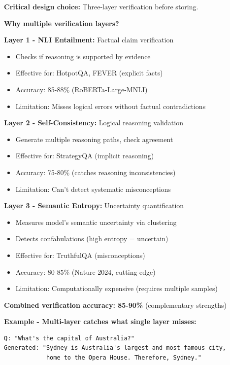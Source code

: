 \documentclass[12pt,a4paper]{article}
\theoremstyle{definition}
\begin{document}
\begin{keyinsightbox}
\textbf{Critical design choice:} Three-layer verification before storing.

\textbf{Why multiple verification layers?}

\textbf{Layer 1 - NLI Entailment:} Factual claim verification
\begin{itemize}
    \item Checks if reasoning is supported by evidence
    \item Effective for: HotpotQA, FEVER (explicit facts)
    \item Accuracy: 85-88\% (RoBERTa-Large-MNLI)
    \item Limitation: Misses logical errors without factual contradictions
\end{itemize}

\textbf{Layer 2 - Self-Consistency:} Logical reasoning validation
\begin{itemize}
    \item Generate multiple reasoning paths, check agreement
    \item Effective for: StrategyQA (implicit reasoning)
    \item Accuracy: 75-80\% (catches reasoning inconsistencies)
    \item Limitation: Can't detect systematic misconceptions
\end{itemize}

\textbf{Layer 3 - Semantic Entropy:} Uncertainty quantification
\begin{itemize}
    \item Measures model's semantic uncertainty via clustering
    \item Detects confabulations (high entropy = uncertain)
    \item Effective for: TruthfulQA (misconceptions)
    \item Accuracy: 80-85\% (Nature 2024, cutting-edge)
    \item Limitation: Computationally expensive (requires multiple samples)
\end{itemize}

\textbf{Combined verification accuracy: 85-90\%} (complementary strengths)

\textbf{Example - Multi-layer catches what single layer misses:}
\begin{verbatim}
Q: "What's the capital of Australia?"
Generated: "Sydney is Australia's largest and most famous city, 
            home to the Opera House. Therefore, Sydney."


\end{verbatim}
\end{keyinsightbox}
\end{document}
